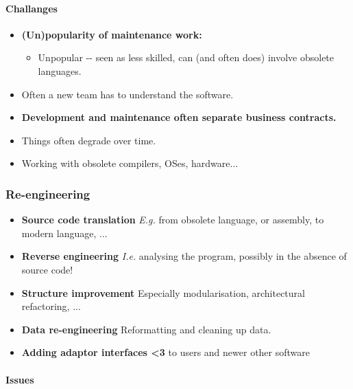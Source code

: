 \documentclass[a4paper]{article}
\providecommand{\tightlist}{%
  \setlength{\itemsep}{0pt}\setlength{\parskip}{0pt}}
\let\oldparagraph\paragraph
\renewcommand{\paragraph}[1]{\oldparagraph{#1}\mbox{}}
\begin{document}
\hypertarget{challanges}{%
\paragraph{Challanges}\label{challanges}}

\begin{itemize}
\tightlist
\item
  \textbf{(Un)popularity of maintenance work:}

  \begin{itemize}
  \tightlist
  \item
    Unpopular -\/- seen as less skilled, can (and often does) involve
    obsolete languages.
  \end{itemize}
\item
  Often a new team has to understand the software.
\item
  \textbf{Development and maintenance often separate business
  contracts.}
\item
  Things often degrade over time.
\item
  Working with obsolete compilers, OSes, hardware...
\end{itemize}

\hypertarget{re-engineering}{%
\subsubsection{Re-engineering}\label{re-engineering}}

\begin{itemize}
\tightlist
\item
  \textbf{Source code translation} \emph{E.g.} from obsolete language,
  or assembly, to modern language, ...
\item
  \textbf{Reverse engineering} \emph{I.e.} analysing the program,
  possibly in the absence of source code!
\item
  \textbf{Structure improvement} Especially modularisation,
  architectural refactoring, ...
\item
  \textbf{Data re-engineering} Reformatting and cleaning up data.
\item
  \textbf{Adding adaptor interfaces \textless{}3} to users and newer
  other software
\end{itemize}

\hypertarget{issues}{%
\paragraph{Issues}\label{issues}}
\end{document}
